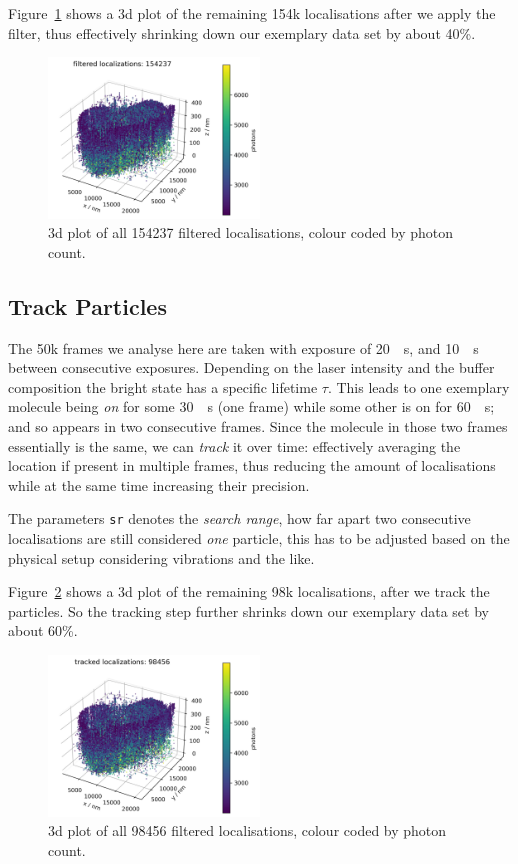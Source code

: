 \documentclass[11pt, a4paper, oneside, twocolumn]{report}
\renewcommand{\tt}{\texttt}
\newcommand{\e}{\emph}
\newcommand{\m}{\mathrm}
\newcommand{\x}[1]{#1\index{#1}}
\begin{document}
Figure~\ref{f:4_filter} shows a 3d plot of the remaining 154k
localisations after we apply the filter, thus effectively shrinking
down our exemplary data set by about 40\%.

\begin{figure}[h!]
  \centering
  \includegraphics[width=0.5\textwidth]{4_filter.png}
  \caption{3d plot of all 154237 filtered localisations, colour coded
    by photon count.}
  \label{f:4_filter}
\end{figure}


\subsection{Track Particles}

The 50k frames we analyse here are taken with exposure of
\SI{20}{\m\s}, and \SI{10}{\m\s} between consecutive
exposures. Depending on the laser intensity and the buffer composition
the bright state has a specific lifetime $\tau$. This leads to one
exemplary molecule being \e{on} for some \SI{30}{\m\s} (one frame)
while some other is on for \SI{60}{\m\s}; and so appears in two
consecutive frames. Since the molecule in those two frames essentially
is the same, we can \e{track} it over time: effectively averaging the
location if present in multiple frames, thus reducing the amount of
localisations while at the same time increasing their precision.

The parameters \tt{sr} denotes the \e{search range}, how far apart two
consecutive localisations are still considered \e{one} particle, this
has to be adjusted based on the physical setup considering vibrations
and the like.

Figure~\ref{f:5_tracking} shows a 3d plot of the remaining 98k
localisations, after we track the particles. So the \x{tracking} step
further shrinks down our exemplary data set by about 60\%.

\begin{figure}[h!]
  \centering
  \includegraphics[width=0.5\textwidth]{5_tracking.png}
  \caption{3d plot of all 98456 filtered localisations, colour coded by
    photon count.}
  \label{f:5_tracking}
\end{figure}
\end{document}
